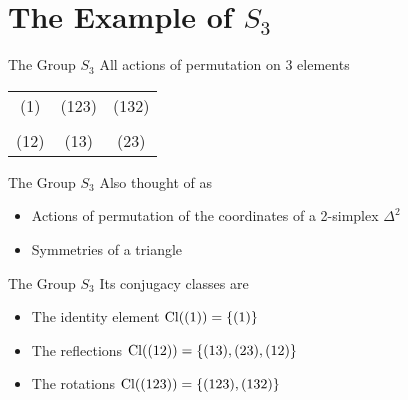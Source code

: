 
\section{The Example of $S_3$}

\begin{frame}{The Group $S_3$}
    \large
    All actions of permutation on $3$ elements

    \pause
    \vspace{2em}
    \centering
    \begin{tabular}{c c c}
        (1)  & (123) & (132) \\\\
        (12) & (13)  & (23)
    \end{tabular}
\end{frame}

\begin{frame}{The Group $S_3$}
    Also thought of as
    
    \pause
    \vspace{1em}
    \begin{itemize}
        \item Actions of permutation of the coordinates of a 2-simplex $\Delta^2$
            \pause
        \item Symmetries of a triangle
    \end{itemize}
\end{frame}

\begin{frame}{The Group $S_3$}
    \large
    Its conjugacy classes are

    \pause
    \vspace{1em}
    \begin{itemize}
        \item The identity element \hspace*{\fill} $\operatorname{Cl}((1)) = \{(1)\}$
            \pause
        \item The reflections \hspace*{\fill} $\operatorname{Cl}((12)) = \{(13), (23), (12)\}$
            \pause
        \item The rotations \hspace*{\fill} $\operatorname{Cl}((123)) = \{(123), (132)\}$
    \end{itemize}
\end{frame}

